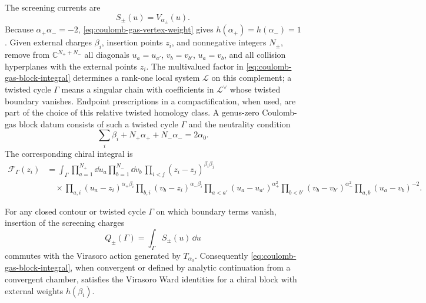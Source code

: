 \begin{definition}
\label{def:coulomb-gas-screening-block-datum}
The screening currents are
\begin{equation}
  S_\pm(u)=V_{\alpha_\pm}(u).
  \label{eq:coulomb-gas-screening-currents}
\end{equation}
Because \(\alpha_+\alpha_-=-2\), \eqref{eq:coulomb-gas-vertex-weight} gives
\(h(\alpha_+)=h(\alpha_-)=1\).  Given external charges
\(\beta_i\), insertion points \(z_i\), and nonnegative integers
\(N_\pm\), remove from
\(\mathbb C^{N_++N_-}\) all diagonals \(u_a=u_{a'}\),
\(v_b=v_{b'}\), \(u_a=v_b\), and all collision hyperplanes with the
external points \(z_i\).  The multivalued factor in
\eqref{eq:coulomb-gas-block-integral} determines a rank-one local system
\(\mathcal L\) on this complement; a twisted cycle \(\Gamma\) means a
singular chain with coefficients in \(\mathcal L^\vee\) whose twisted
boundary vanishes.  Endpoint prescriptions in a compactification, when used,
are part of the choice of this relative twisted homology class.  A
genus-zero Coulomb-gas block datum consists of such a twisted cycle
\(\Gamma\) and the neutrality condition
\begin{equation}
  \sum_i\beta_i+N_+\alpha_+ +N_-\alpha_- =2\alpha_0.
  \label{eq:coulomb-gas-neutrality}
\end{equation}
The corresponding chiral integral is
\begin{equation}
\begin{split}
  \mathcal F_\Gamma(z_i)
  &=
  \int_\Gamma
  \prod_{a=1}^{N_+}\dd u_a
  \prod_{b=1}^{N_-}\dd v_b\,
  \prod_{i<j}(z_i-z_j)^{\beta_i\beta_j}
\\
  &\quad\times
  \prod_{a,i}(u_a-z_i)^{\alpha_+\beta_i}
  \prod_{b,i}(v_b-z_i)^{\alpha_-\beta_i}
  \prod_{a<a'}(u_a-u_{a'})^{\alpha_+^2}
  \prod_{b<b'}(v_b-v_{b'})^{\alpha_-^2}
  \prod_{a,b}(u_a-v_b)^{-2}.
\end{split}
  \label{eq:coulomb-gas-block-integral}
\end{equation}
\end{definition}

\begin{lemma}
\label{lem:coulomb-gas-screening-intertwiners}
For any closed contour or twisted cycle \(\Gamma\) on which boundary terms
vanish, insertion of the screening charges
\[
  Q_\pm(\Gamma)=\int_\Gamma S_\pm(u)\,\dd u
\]
commutes with the Virasoro action generated by \(T_{\alpha_0}\).  Consequently
\eqref{eq:coulomb-gas-block-integral}, when convergent or defined by analytic
continuation from a convergent chamber, satisfies the Virasoro Ward identities
for a chiral block with external weights \(h(\beta_i)\).
\end{lemma}

